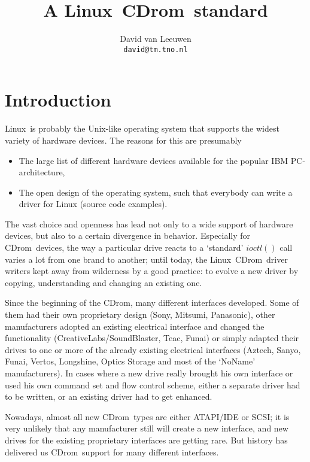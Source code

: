 \documentclass{article}
\def\linux{{\sc Linux}}
\def\cdrom{{\sc CDrom}}
\begin{document}
\title{A \linux\ \cdrom\ standard}
\author{David van Leeuwen\\{\normalsize\tt david@tm.tno.nl}}

\maketitle

\section{Introduction}

\linux\ is probably the Unix-like operating system that supports the widest
variety of hardware devices. The reasons for this are presumably
\begin{itemize}
\item The large list of different hardware devices available for the popular
IBM PC-architecture,
\item The open design of the operating system, such that everybody can
write a driver for Linux (source code examples).
\end{itemize}
The vast choice and openness has lead not only to a wide support of
hardware devices, but also to a certain divergence in behavior. Especially
for \cdrom\ devices, the way a particular drive reacts to a `standard'
$ioctl()$ call varies a lot from one brand to another; until today, the
\linux\ \cdrom\ driver writers kept away from wilderness by a good practice:
to evolve a new driver by copying, understanding and changing an existing
one.

Since the beginning of the \cdrom, many different interfaces developed.
Some of them had their own proprietary design (Sony, Mitsumi, Panasonic),
other manufacturers adopted an existing electrical interface and changed
the functionality (CreativeLabs/SoundBlaster, Teac, Funai) or simply adapted
their drives to one or more of the already existing electrical interfaces
(Aztech, Sanyo, Funai, Vertos, Longshine, Optics Storage and most of the
`NoName' manufacturers).
In cases where a new drive really brought his own interface or used his
own command set and flow control scheme, either a separate driver had to
be written, or an existing driver had to get enhanced.

Nowadays, almost all new \cdrom\ types are either ATAPI/IDE or SCSI;
it is very unlikely that any manufacturer still will create a new
interface, and new drives for the existing proprietary interfaces are
getting rare.
But history has delivered us \cdrom\ support for many different interfaces.
\end{document}
